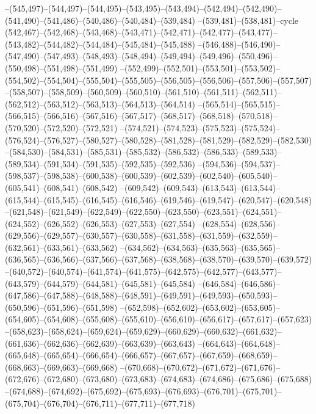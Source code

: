--(545,497)--(544,497)--(544,495)--(543,495)--(543,494)--(542,494)--(542,490)--(541,490)--(541,486)--(540,486)--(540,484)--(539,484)
--(539,481)--(538,481)--cycle
(542,467)--(542,468)--(543,468)--(543,471)--(542,471)--(542,477)--(543,477)--(543,482)--(544,482)--(544,484)--(545,484)--(545,488)
--(546,488)--(546,490)--(547,490)--(547,493)--(548,493)--(548,494)--(549,494)--(549,496)--(550,496)--(550,498)--(551,498)--(551,499)
--(552,499)--(552,501)--(553,501)--(553,502)--(554,502)--(554,504)--(555,504)--(555,505)--(556,505)--(556,506)--(557,506)--(557,507)
--(558,507)--(558,509)--(560,509)--(560,510)--(561,510)--(561,511)--(562,511)--(562,512)--(563,512)--(563,513)--(564,513)--(564,514)
--(565,514)--(565,515)--(566,515)--(566,516)--(567,516)--(567,517)--(568,517)--(568,518)--(570,518)--(570,520)--(572,520)--(572,521)
--(574,521)--(574,523)--(575,523)--(575,524)--(576,524)--(576,527)--(580,527)--(580,528)--(581,528)--(581,529)--(582,529)--(582,530)
--(584,530)--(584,531)--(585,531)--(585,532)--(586,532)--(586,533)--(589,533)--(589,534)--(591,534)--(591,535)--(592,535)--(592,536)
--(594,536)--(594,537)--(598,537)--(598,538)--(600,538)--(600,539)--(602,539)--(602,540)--(605,540)--(605,541)--(608,541)--(608,542)
--(609,542)--(609,543)--(613,543)--(613,544)--(615,544)--(615,545)--(616,545)--(616,546)--(619,546)--(619,547)--(620,547)--(620,548)
--(621,548)--(621,549)--(622,549)--(622,550)--(623,550)--(623,551)--(624,551)--(624,552)--(626,552)--(626,553)--(627,553)--(627,554)
--(628,554)--(628,556)--(629,556)--(629,557)--(630,557)--(630,558)--(631,558)--(631,559)--(632,559)--(632,561)--(633,561)--(633,562)
--(634,562)--(634,563)--(635,563)--(635,565)--(636,565)--(636,566)--(637,566)--(637,568)--(638,568)--(638,570)--(639,570)--(639,572)
--(640,572)--(640,574)--(641,574)--(641,575)--(642,575)--(642,577)--(643,577)--(643,579)--(644,579)--(644,581)--(645,581)--(645,584)
--(646,584)--(646,586)--(647,586)--(647,588)--(648,588)--(648,591)--(649,591)--(649,593)--(650,593)--(650,596)--(651,596)--(651,598)
--(652,598)--(652,602)--(653,602)--(653,605)--(654,605)--(654,608)--(655,608)--(655,610)--(656,610)--(656,617)--(657,617)--(657,623)
--(658,623)--(658,624)--(659,624)--(659,629)--(660,629)--(660,632)--(661,632)--(661,636)--(662,636)--(662,639)--(663,639)--(663,643)
--(664,643)--(664,648)--(665,648)--(665,654)--(666,654)--(666,657)--(667,657)--(667,659)--(668,659)--(668,663)--(669,663)--(669,668)
--(670,668)--(670,672)--(671,672)--(671,676)--(672,676)--(672,680)--(673,680)--(673,683)--(674,683)--(674,686)--(675,686)--(675,688)
--(674,688)--(674,692)--(675,692)--(675,693)--(676,693)--(676,701)--(675,701)--(675,704)--(676,704)--(676,711)--(677,711)--(677,718)
